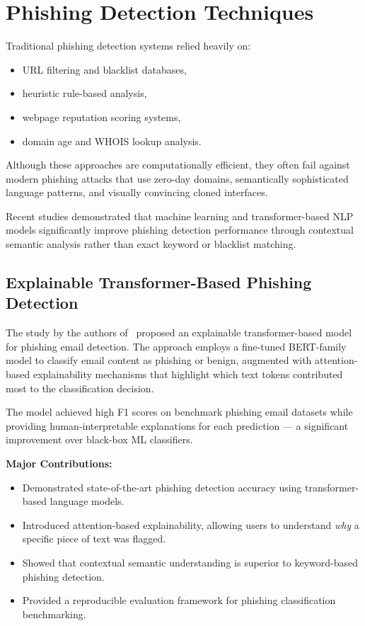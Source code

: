 
\section{Phishing Detection Techniques}

Traditional phishing detection systems relied heavily on:
\begin{itemize}
\item URL filtering and blacklist databases,
\item heuristic rule-based analysis,
\item webpage reputation scoring systems,
\item domain age and WHOIS lookup analysis.
\end{itemize}

Although these approaches are computationally efficient, they often fail against modern phishing attacks that use zero-day domains, semantically sophisticated language patterns, and visually convincing cloned interfaces.

Recent studies demonstrated that machine learning and transformer-based NLP models significantly improve phishing detection performance through contextual semantic analysis rather than exact keyword or blacklist matching.


\subsection{Explainable Transformer-Based Phishing Detection}

The study by the authors of~\cite{phishing2024} proposed an explainable transformer-based model for phishing email detection. The approach employs a fine-tuned BERT-family model to classify email content as phishing or benign, augmented with attention-based explainability mechanisms that highlight which text tokens contributed most to the classification decision.

The model achieved high F1 scores on benchmark phishing email datasets while providing human-interpretable explanations for each prediction — a significant improvement over black-box ML classifiers.

\vspace{0.3cm}

\textbf{Major Contributions:}
\begin{itemize}
\item Demonstrated state-of-the-art phishing detection accuracy using transformer-based language models.
\item Introduced attention-based explainability, allowing users to understand \textit{why} a specific piece of text was flagged.
\item Showed that contextual semantic understanding is superior to keyword-based phishing detection.
\item Provided a reproducible evaluation framework for phishing classification benchmarking.
\end{itemize}

